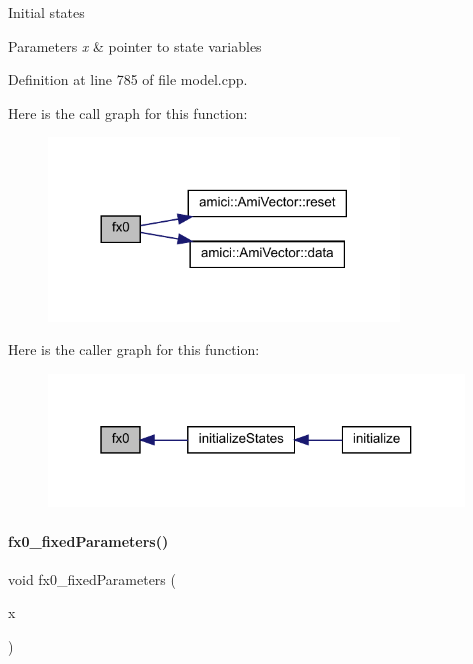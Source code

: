 Initial states 
\begin{DoxyParams}{Parameters}
{\em x} & pointer to state variables \\
\hline
\end{DoxyParams}


Definition at line 785 of file model.\+cpp.

Here is the call graph for this function\+:
\nopagebreak
\begin{figure}[H]
\begin{center}
\leavevmode
\includegraphics[width=264pt]{classamici_1_1_model_aa9a9e12a414d9ac91249b63d01ab7bca_cgraph}
\end{center}
\end{figure}
Here is the caller graph for this function\+:
\nopagebreak
\begin{figure}[H]
\begin{center}
\leavevmode
\includegraphics[width=313pt]{classamici_1_1_model_aa9a9e12a414d9ac91249b63d01ab7bca_icgraph}
\end{center}
\end{figure}
\mbox{\label{classamici_1_1_model_ae517574d2a7c504c388438a08a1aed38}} 
\paragraph{\texorpdfstring{fx0\+\_\+fixed\+Parameters()}{fx0\_fixedParameters()}\hspace{0.1cm}{\footnotesize\ttfamily [1/2]}}
{\footnotesize\ttfamily void fx0\+\_\+fixed\+Parameters (\begin{DoxyParamCaption}\item[{\mbox{\hyperlink{classamici_1_1_ami_vector}{Ami\+Vector}} $\ast$}]{x }\end{DoxyParamCaption})}


